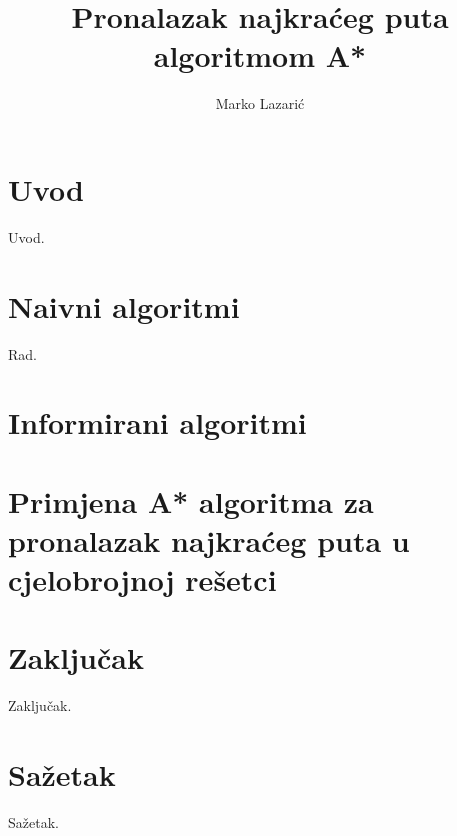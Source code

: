 \documentclass[times, utf8, seminar, numeric]{fer}
\begin{document}
\nocite{*}

\title{Pronalazak najkraćeg puta algoritmom A*}

\author{Marko Lazarić}


\maketitle

\tableofcontents

\chapter{Uvod}
Uvod.

\chapter{Naivni algoritmi}
Rad.

\chapter{Informirani algoritmi}

\chapter{Primjena A* algoritma za pronalazak najkraćeg puta u cjelobrojnoj rešetci}


\chapter{Zaključak}
Zaključak.




\chapter{Sažetak}
Sažetak.
\end{document}
